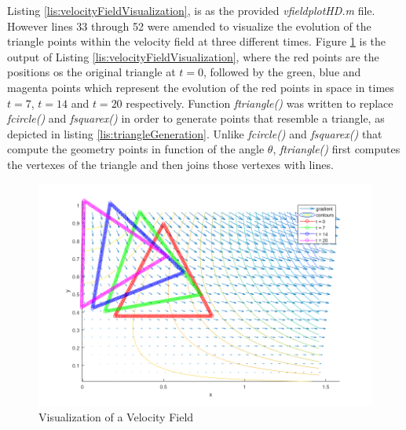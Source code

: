 \documentclass{article}
\begin{document}
Listing \ref{lis:velocityFieldVisualization}, is as the provided \emph{vfieldplotHD.m} file. However lines 33 through 52 were amended to visualize the evolution of the triangle points within the velocity field at three different times. Figure \ref{img:aVectorField} is the output of Listing \ref{lis:velocityFieldVisualization}, where the red points are the positions os the original triangle at $t = 0$, followed by the green, blue and magenta points which represent the evolution of the red points in space in times $t = 7$, $t = 14$ and $t = 20$ respectively. Function \emph{ftriangle()} was written to replace \emph{fcircle()} and \emph{fsquarex()} in order to generate points that resemble a triangle, as depicted in listing \ref{lis:triangleGeneration}. Unlike \emph{fcircle()} and \emph{fsquarex()} that compute the geometry points in function of the angle $\theta$, \emph{ftriangle()} first computes the vertexes of the triangle and then joins those vertexes with lines.

\begin{figure}[h!]
	\centering
	\includegraphics[width=1.00\textwidth]{./matlab/velocityField.png}
	\caption{Visualization of a Velocity Field}
	\label{img:aVectorField}
\end{figure}

\newpage
\end{document}
